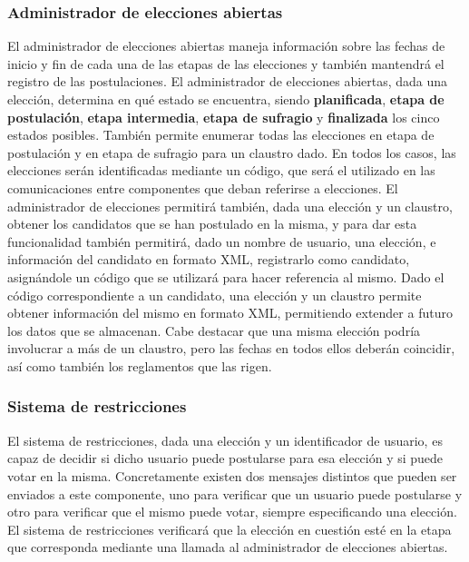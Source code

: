 \subsubsection{Administrador de elecciones abiertas}

\label{admin_elecciones}

El administrador de elecciones abiertas maneja información sobre las fechas de inicio y fin de cada una de las etapas de las elecciones y también mantendrá el registro de las postulaciones. 
El administrador de elecciones abiertas, dada una elección, determina en qué estado se encuentra, siendo {\bf planificada}, {\bf etapa de postulación}, {\bf etapa intermedia},  {\bf etapa de sufragio} y {\bf finalizada} los cinco estados posibles. También permite enumerar todas las elecciones en etapa de postulación y en etapa de sufragio para un claustro dado. En todos los casos, las elecciones serán identificadas mediante un código, que será el utilizado en las comunicaciones entre componentes que deban referirse a elecciones.
El administrador de elecciones permitirá también, dada una elección y un claustro, obtener los candidatos que se han postulado en la misma, y para dar esta funcionalidad también permitirá, dado un nombre de usuario, una elección, e información del candidato en formato XML, registrarlo como candidato, asignándole un código que se utilizará para hacer referencia al mismo.
Dado el código correspondiente a un candidato, una elección y un claustro permite obtener información del mismo en formato XML, permitiendo extender a futuro los datos que se almacenan. 
Cabe destacar que una misma elección podría involucrar a más de un claustro, pero las fechas en todos ellos deberán coincidir, así como también los reglamentos que las rigen.

\subsubsection{Sistema de restricciones}

El sistema de restricciones, dada una elección y un identificador de usuario, es capaz de decidir si dicho usuario puede postularse para esa elección y si puede votar en la misma. Concretamente existen dos mensajes distintos que pueden ser enviados a este componente, uno para verificar que un usuario puede postularse y otro para verificar que el mismo puede votar, siempre especificando una elección.
El sistema de restricciones verificará que la elección en cuestión esté en la etapa que corresponda mediante una llamada al administrador de elecciones abiertas.

